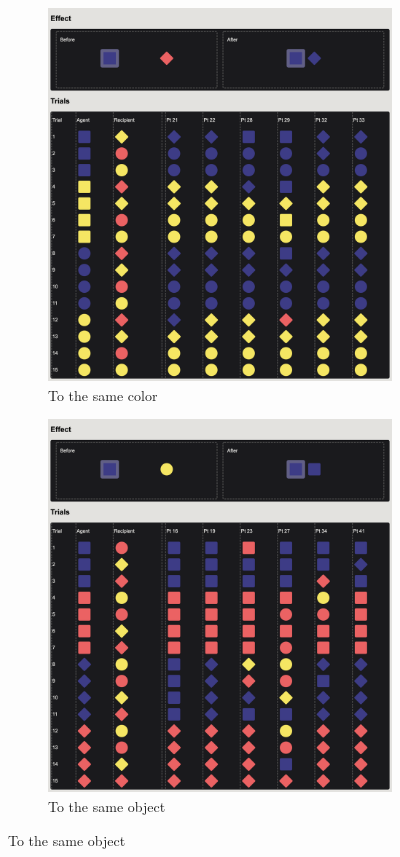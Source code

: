 \documentclass{article}
\begin{document}
\begin{figure}[h!]
\begin{subfigure}[t]{0.31\textwidth}
  	\includegraphics[width=\linewidth]{raw_g3} 
  	\caption{To the same color} \label{fig:raw_g3}
  \end{subfigure}
  \hfill
  \begin{subfigure}[t]{0.31\textwidth}
  	\centering
  	\includegraphics[width=\linewidth]{raw_g6} 
  	\caption{To the same object} \label{fig:raw_g6}
  \end{subfigure}


\end{figure}
\end{document}
